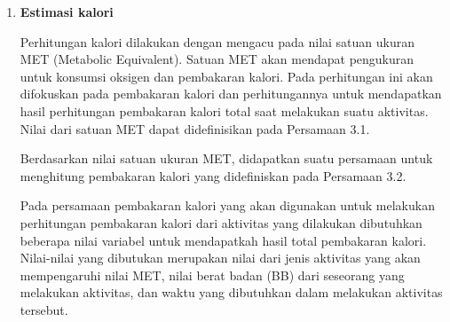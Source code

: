 \begin{enumerate} [label=\textbf{\arabic*}., listparindent=2em]
  Setelah dilakukan training dan klasifikasi, akan didapat model deteksi yang diinginkan. Bentuk hasil klasifikasi yang dibuat adalah mendeteksi pose aktivitas dengan dapat menghitung langkah dan waktu yang ditempuh. Nilai langkah dan waktu yang ditempuh akan digunakan dalam perhitungan selanjutnya.

  \begin{enumerate}[label=\textbf{\alph*}., listparindent=2em]
    \item Hasil deteksi langkah
    
    Banyaknya jumlah langkah yang didapat saat hasil deteksi digunakan sebagai nilai variable pertama yang akan digunakan dalam penentuan perhitungan kalori. Langkah dideteksi dan dihitung seberapa banyak langkah yang dilakukan saat proses deteksi. Nilai banyaknya jumlah langkah akan disimpan dan akan digunakan pada saat proses perhitungan kalori setelah proses deteksi telah selesai dilakukan.

    \item Hasil perhitungan waktu tempuh
    
    Waktu tempuh saat proses deteksi merupakan nilai variabel kedua yang akan digunakan dalam penentuan perhitungan kalori. Waktu tempuh dimulai saat dideteksi pertama kali nilai langkah yang ditemukan hingga saat akhir langkah tidak ada penambahan kembali yang menandakan proses deteksi telah selesai. Nilai waktu akan dibutuhkan dalam satuan waktu menit untuk proses perhitungan kalori.

  \end{enumerate}

  \item \textbf{Estimasi kalori}
  
  Perhitungan kalori dilakukan dengan mengacu pada nilai satuan ukuran MET (Metabolic Equivalent). Satuan MET akan mendapat pengukuran untuk konsumsi oksigen dan pembakaran kalori. Pada perhitungan ini akan difokuskan pada pembakaran kalori dan perhitungannya untuk mendapatkan hasil perhitungan pembakaran kalori total saat melakukan suatu aktivitas. Nilai dari satuan MET dapat didefinisikan pada Persamaan 3.1.

  
  Berdasarkan nilai satuan ukuran MET, didapatkan suatu persamaan untuk menghitung pembakaran kalori yang didefiniskan pada Persamaan 3.2.


  Pada persamaan pembakaran kalori yang akan digunakan untuk melakukan perhitungan pembakaran kalori dari aktivitas yang dilakukan dibutuhkan beberapa nilai variabel untuk mendapatkah hasil total pembakaran kalori. Nilai-nilai yang dibutukan merupakan nilai dari jenis aktivitas yang akan mempengaruhi nilai MET, nilai berat badan (BB) dari seseorang yang melakukan aktivitas, dan waktu yang dibutuhkan dalam melakukan aktivitas tersebut.


\end{enumerate}
